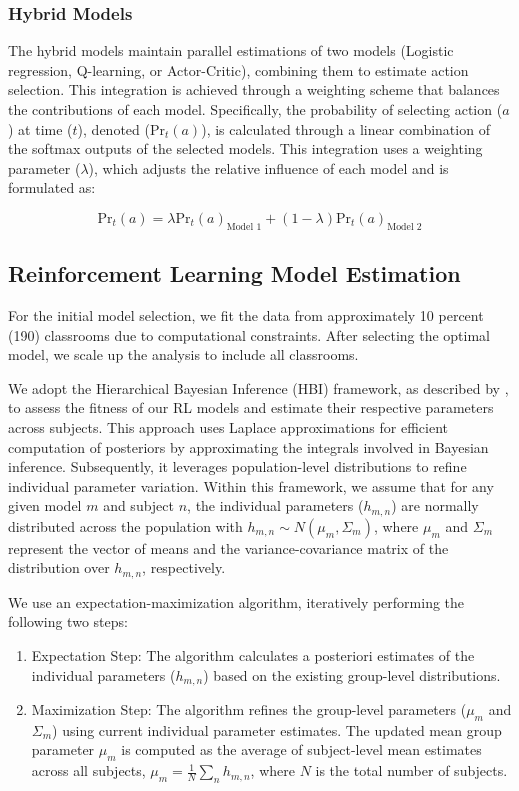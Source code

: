 \documentclass[
  number,
  preprint,
  3p,
  onecolumn]{elsarticle}
\providecommand{\tightlist}{%
  \setlength{\itemsep}{0pt}\setlength{\parskip}{0pt}}\usepackage{longtable,booktabs,array}
\begin{document}
\subsubsection{Hybrid Models}\label{hybrid-models}

The hybrid models maintain parallel estimations of two models (Logistic
regression, Q-learning, or Actor-Critic), combining them to estimate
action selection. This integration is achieved through a weighting
scheme that balances the contributions of each model. Specifically, the
probability of selecting action (\(a\)) at time (\(t\)), denoted
(\(\text{Pr}_t(a)\)), is calculated through a linear combination of the
softmax outputs of the selected models. This integration uses a
weighting parameter (\(\lambda\)), which adjusts the relative influence
of each model and is formulated as:

\[
\text{Pr}_t(a) = \lambda \text{Pr}_t(a)_{\text{Model 1}} + (1-\lambda) \text{Pr}_t(a)_{\text{Model 2}}
\]

\subsection{Reinforcement Learning Model
Estimation}\label{reinforcement-learning-model-estimation}

For the initial model selection, we fit the data from approximately 10
percent (190) classrooms due to computational constraints. After
selecting the optimal model, we scale up the analysis to include all
classrooms.

We adopt the Hierarchical Bayesian Inference (HBI) framework, as
described by \citep{piray2019a}, to assess the fitness of our RL models
and estimate their respective parameters across subjects. This approach
uses Laplace approximations for efficient computation of posteriors by
approximating the integrals involved in Bayesian inference.
Subsequently, it leverages population-level distributions to refine
individual parameter variation. Within this framework, we assume that
for any given model \(m\) and subject \(n\), the individual parameters
(\(h_{m,n}\)) are normally distributed across the population with
\(h_{m,n} \sim N(\mu_m, \Sigma_m)\), where \(\mu_m\) and \(\Sigma_m\)
represent the vector of means and the variance-covariance matrix of the
distribution over \(h_{m,n}\), respectively.

We use an expectation-maximization algorithm, iteratively performing the
following two steps:

\begin{enumerate}
\def\labelenumi{\arabic{enumi}.}
\tightlist
\item
  Expectation Step: The algorithm calculates a posteriori estimates of
  the individual parameters (\(h_{m,n}\)) based on the existing
  group-level distributions.
\item
  Maximization Step: The algorithm refines the group-level parameters
  (\(\mu_m\) and \(\Sigma_m\)) using current individual parameter
  estimates. The updated mean group parameter \(\mu_m\) is computed as
  the average of subject-level mean estimates across all subjects,
  \(\mu_m = \frac{1}{N}\sum_{n}h_{m,n}\), where \(N\) is the total
  number of subjects.
\end{enumerate}
\end{document}
